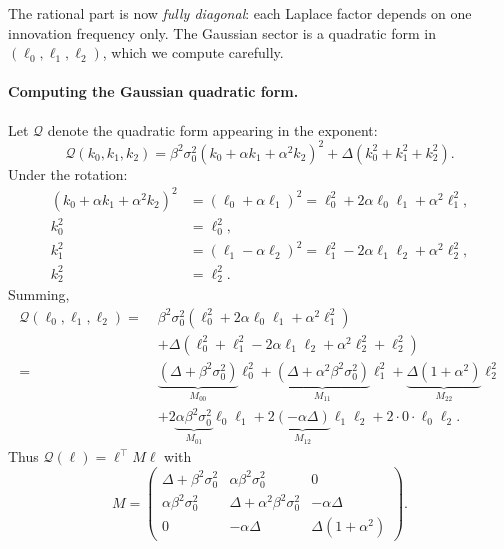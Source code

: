 \documentclass[11pt,a4paper,openany]{book}
\theoremstyle{plainserif}
\theoremstyle{definition}
\theoremstyle{remarkstyle}
\begin{document}
The rational part is now \emph{fully diagonal}: each Laplace factor
depends on one innovation frequency only. The Gaussian sector is a
quadratic form in $(\ell_0, \ell_1, \ell_2)$, which we compute carefully.

\paragraph{Computing the Gaussian quadratic form.}
Let $\mathcal{Q}$ denote the quadratic form appearing in the exponent:
\begin{equation}
\mathcal{Q}(k_0, k_1, k_2) = \beta^2\sigma_0^2 (k_0+\alpha k_1+\alpha^2 k_2)^2
 + \Delta(k_0^2+k_1^2+k_2^2).
\end{equation}
Under the rotation:
\begin{align}
(k_0+\alpha k_1+\alpha^2 k_2)^2 &= (\ell_0 + \alpha\ell_1)^2
  = \ell_0^2 + 2\alpha\ell_0\ell_1 + \alpha^2\ell_1^2, \\
k_0^2 &= \ell_0^2, \\
k_1^2 &= (\ell_1 - \alpha\ell_2)^2 = \ell_1^2 - 2\alpha\ell_1\ell_2 + \alpha^2\ell_2^2, \\
k_2^2 &= \ell_2^2.
\end{align}
Summing,
\begin{align}
\mathcal{Q}(\ell_0, \ell_1, \ell_2) =\;&
\beta^2\sigma_0^2 (\ell_0^2 + 2\alpha\ell_0\ell_1 + \alpha^2\ell_1^2) \nonumber \\
&+ \Delta\left(\ell_0^2 + \ell_1^2 - 2\alpha\ell_1\ell_2 + \alpha^2\ell_2^2 + \ell_2^2\right) \nonumber \\
=\;& \underbrace{(\Delta + \beta^2\sigma_0^2)}_{M_{00}}\ell_0^2
  + \underbrace{(\Delta + \alpha^2\beta^2\sigma_0^2)}_{M_{11}}\ell_1^2
  + \underbrace{\Delta(1+\alpha^2)}_{M_{22}}\ell_2^2 \nonumber \\
& + 2\underbrace{\alpha\beta^2\sigma_0^2}_{M_{01}}\ell_0\ell_1
  + 2\underbrace{(-\alpha\Delta)}_{M_{12}}\ell_1\ell_2 + 2\cdot 0\cdot \ell_0\ell_2.
\label{eq:Q-rotated}
\end{align}
Thus $\mathcal{Q}(\ell) = \ell^\top M \ell$ with
\begin{equation}
\boxed{\;
M = \begin{pmatrix}
\Delta + \beta^2\sigma_0^2 & \alpha\beta^2\sigma_0^2 & 0 \\
\alpha\beta^2\sigma_0^2 & \Delta + \alpha^2\beta^2\sigma_0^2 & -\alpha\Delta \\
0 & -\alpha\Delta & \Delta(1 + \alpha^2)
\end{pmatrix}.
\;}
\label{eq:M-matrix}
\end{equation}
\end{document}
